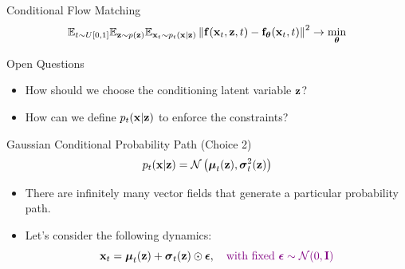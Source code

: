 \documentclass{beamer}
\begin{document}
\begin{frame}{Conditional Flow Matching}
	\vspace{-0.3cm}
	\[
		\mathbb{E}_{t \sim U[0, 1]} \mathbb{E}_{\mathbf{z} \sim p(\mathbf{z})} \mathbb{E}_{\mathbf{x}_t \sim p_t(\mathbf{x} | \mathbf{z})}\left\| \mathbf{f}(\mathbf{x}_t, \mathbf{z}, t) - \mathbf{f}_{\boldsymbol{\theta}}(\mathbf{x}_t, t) \right\|^2 \rightarrow \min_{\boldsymbol{\theta}}
	\]
	\eqpause
	\vspace{-0.4cm}
	\begin{block}{Open Questions}
		\begin{itemize}
			\item How should we choose the conditioning latent variable $\mathbf{z}$?
			\item How can we define $p_t(\mathbf{x} | \mathbf{z})$ to enforce the constraints?
		\end{itemize}
	\end{block}
	\eqpause
	\vspace{-0.3cm}
	\begin{block}{Gaussian Conditional Probability Path (Choice 2)}
		\vspace{-0.3cm}
		\[
			p_t(\mathbf{x} | \mathbf{z}) = \mathcal{N}\left(\boldsymbol{\mu}_t(\mathbf{z}), \boldsymbol{\sigma}_t^2(\mathbf{z})\right)
		\]
		\eqpause
		\vspace{-0.5cm}
	\end{block}
	\begin{itemize}
		\item There are infinitely many vector fields that generate a particular probability path.
		\item Let's consider the following dynamics:
		\[
			\mathbf{x}_t = \boldsymbol{\mu}_t(\mathbf{z}) + \boldsymbol{\sigma}_t(\mathbf{z}) \odot \boldsymbol{\epsilon}, \quad {\color{violet} \text{with fixed } \boldsymbol{\epsilon}\sim \mathcal{N}(0, \mathbf{I})}
		\]
	\end{itemize}
\end{frame}
\end{document}
